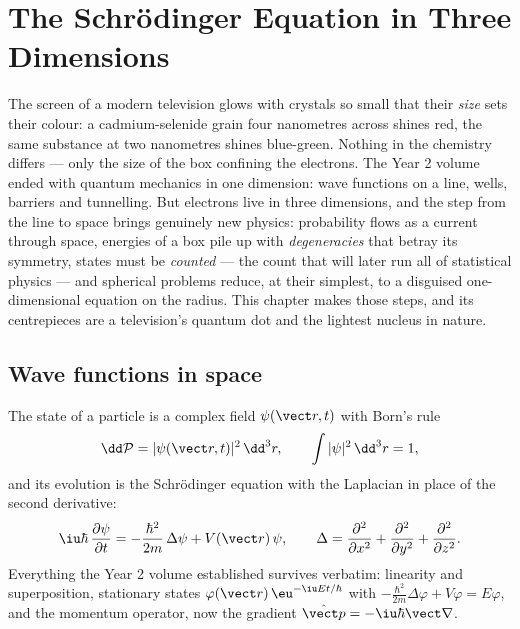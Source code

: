 \chapter{The Schrödinger Equation in Three Dimensions}\label{ch:b3:schrodinger-three-dimensions}

The screen of a modern television glows with crystals so small that
their \emph{size} sets their colour: a cadmium-selenide grain four
nanometres across shines red, the same substance at two nanometres
shines blue-green. Nothing in the chemistry differs --- only the size
of the box confining the electrons. The Year 2 volume ended with
quantum mechanics in one dimension: wave functions on a line, wells,
barriers and tunnelling. But electrons live in three dimensions, and
the step from the line to space brings genuinely new physics:
probability flows as a current through space, energies of a box pile
up with \emph{degeneracies} that betray its symmetry, states must be
\emph{counted} --- the count that will later run all of statistical
physics --- and spherical problems reduce, at their simplest, to a
disguised one-dimensional equation on the radius. This chapter makes
those steps, and its centrepieces are a television's quantum dot and
the lightest nucleus in nature.

\section{Wave functions in space}

\begin{definition}\label{def:b3:schrodinger-three-dimensions:psi3d}
The state of a particle is a complex field $\psi(\vect r, t)$ with
Born's rule
\[
\dd\mathcal P = |\psi(\vect r, t)|^2\,\dd^3r , \qquad
\int|\psi|^2\,\dd^3r = 1 ,
\]
and its evolution is the Schrödinger equation with the Laplacian in
place of the second derivative:
\[
\iu\hbar\,\frac{\partial\psi}{\partial t}
 = -\frac{\hbar^2}{2m}\,\Delta\psi + V(\vect r)\,\psi ,
\qquad
\Delta = \frac{\partial^2}{\partial x^2} +
\frac{\partial^2}{\partial y^2} + \frac{\partial^2}{\partial z^2} .
\]
Everything the Year 2 volume established survives verbatim:
linearity and superposition, stationary states
$\varphi(\vect r)\,\eu^{-\iu Et/\hbar}$ with
$-\tfrac{\hbar^2}{2m}\Delta\varphi + V\varphi = E\varphi$, and the
momentum operator, now the gradient $\hat{\vect p} =
-\iu\hbar\vect\nabla$.
\end{definition}

